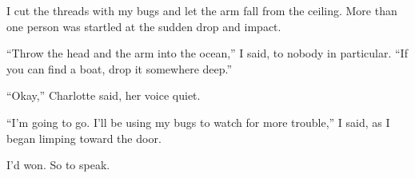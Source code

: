I cut the threads with my bugs and let the arm fall from the ceiling.  More than one person was startled at the sudden drop and impact.



``Throw the head and the arm into the ocean,'' I said, to nobody in particular.  ``If you can find a boat, drop it somewhere deep.''



``Okay,'' Charlotte said, her voice quiet.



``I'm going to go.  I'll be using my bugs to watch for more trouble,'' I said, as I began limping toward the door.



I'd won.  So to speak.





